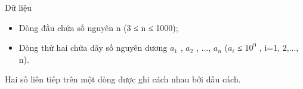 Dữ liệu
\begin{itemize}
	\item Dòng đầu chứa số nguyên n (3 ≤ n ≤ 1000);
	\item Dòng thứ hai chứa dãy số nguyên dương $a_{1}$ , $a_{2}$ , ..., $a_{n}$ ($a_{i}$ ≤ $10^{9}$ , i=1, 2,..., n).
\end{itemize}

Hai số liên tiếp trên một dòng được ghi cách nhau bởi dấu cách.